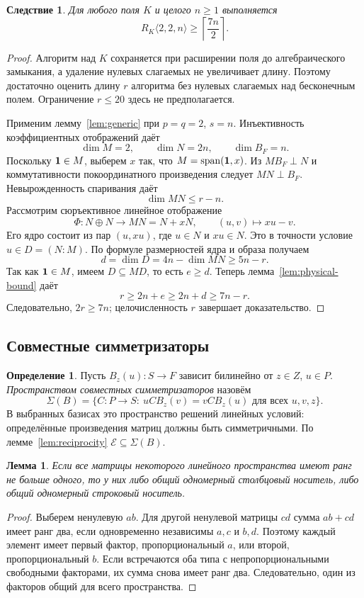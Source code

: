 \documentclass[11pt,a4paper]{article}
\numberwithin{equation}{section}
\theoremstyle{plain}
\newtheorem{lemma}[theorem]{Лемма}
\newtheorem{cor}[theorem]{Следствие}
\theoremstyle{definition}
\newtheorem{definition}[theorem]{Определение}
\newcommand{\E}{\mathcal E}\newcommand{\Sig}{\Sigma}
\newcommand{\leqs}{\leqslant}\newcommand{\geqs}{\geqslant}
\begin{document}
\begin{cor}\label{cor:two-two-n}
Для любого поля $K$ и целого $n\geqs1$ выполняется
\[
 R_K\langle2,2,n\rangle\geqs\left\lceil\frac{7n}{2}\right\rceil.
\]
\end{cor}
\begin{proof}
Алгоритм над $K$ сохраняется при расширении поля до алгебраического
замыкания, а удаление нулевых слагаемых не увеличивает длину.
Поэтому достаточно оценить длину $r$ алгоритма без нулевых
слагаемых над бесконечным полем. Ограничение $r\leqs20$
здесь не предполагается.

Применим лемму~\ref{lem:generic} при $p=q=2$, $s=n$.
Инъективность коэффициентных отображений даёт
\[
 \dim M=2,\qquad \dim N=2n,\qquad \dim B_F=n.
\]
Поскольку $\mathbf1\in M$, выберем $x$ так, что $M=\operatorname{span}(\mathbf1,x)$.
Из $MB_F\perp N$ и коммутативности покоординатного произведения
следует $MN\perp B_F$. Невырожденность спаривания даёт
\[
 \dim MN\leqs r-n.
\]
Рассмотрим сюръективное линейное отображение
\[
 \Phi:N\oplus N\longrightarrow MN=N+xN,\qquad
 (u,v)\longmapsto xu-v.
\]
Его ядро состоит из пар $(u,xu)$, где $u\in N$ и $xu\in N$.
Это в точности условие $u\in D=(N:M)$. По формуле размерностей
ядра и образа получаем
\[
 d=\dim D=4n-\dim MN\geqs5n-r.
\]
Так как $\mathbf1\in M$, имеем $D\subseteq MD$, то есть $e\geqs d$.
Теперь лемма~\ref{lem:physical-bound} даёт
\[
 r\geqs2n+e\geqs2n+d\geqs7n-r.
\]
Следовательно, $2r\geqs7n$; целочисленность $r$ завершает доказательство.
\end{proof}

\subsection{Совместные симметризаторы}

\begin{definition}
Пусть $B_z(u):S\to F$ зависит билинейно от $z\in Z$, $u\in P$.
\emph{Пространством совместных симметризаторов} назовём
\[
 \Sig(B)=\{C:P\to S:\ uCB_z(v)=vCB_z(u)
                          \text{ для всех }u,v,z\}.
\]
В выбранных базисах это пространство решений линейных условий:
определённые произведения матриц должны быть симметричными.
По лемме~\ref{lem:reciprocity} $\E\subseteq\Sig(B)$.
\end{definition}

\begin{lemma}\label{lem:rank-one-space}
Если все матрицы некоторого линейного пространства имеют ранг не больше
одного, то у них либо общий одномерный столбцовый носитель, либо общий
одномерный строковый носитель.
\end{lemma}
\begin{proof}
Выберем ненулевую $ab$. Для другой ненулевой матрицы $cd$ сумма
$ab+cd$ имеет ранг два, если одновременно независимы $a,c$ и $b,d$.
Поэтому каждый элемент имеет первый фактор, пропорциональный $a$,
или второй, пропорциональный $b$. Если встречаются оба типа с
непропорциональными свободными факторами, их сумма снова имеет ранг два.
Следовательно, один из факторов общий для всего пространства.
\end{proof}
\end{document}
